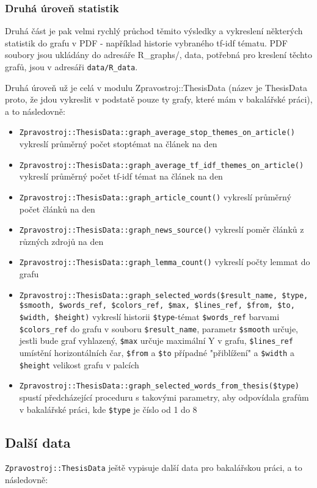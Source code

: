 \documentclass[12pt,a4paper]{report}
\begin{document}
\subsubsection{Druhá úroveň statistik}

Druhá část je pak velmi rychlý průchod těmito výsledky a vykreslení některých statistik do grafu v PDF - například historie vybraného tf-idf tématu. PDF soubory jsou ukládány do adresáře R\_graphs/, data, potřebná pro kreslení těchto grafů, jsou v adresáři \texttt{data/R\_data}.


Druhá úroveň už je celá v modulu Zpravostroj::ThesisData (název je ThesisData proto, že jdou vykreslit v podstatě pouze ty grafy, které mám v bakalářské práci), a to následovně:
\begin{itemize}
	\item \texttt{Zpravostroj::ThesisData::graph\_average\_stop\_themes\_on\_article()} vykreslí průměrný počet stoptémat na článek na den
	\item \texttt{Zpravostroj::ThesisData::graph\_average\_tf\_idf\_themes\_on\_article()} vykreslí průměrný počet tf-idf témat na článek na den
	\item \texttt{Zpravostroj::ThesisData::graph\_article\_count()} vykreslí průměrný počet článků na den
	\item \texttt{Zpravostroj::ThesisData::graph\_news\_source()} vykreslí poměr článků z různých zdrojů na den
	\item \texttt{Zpravostroj::ThesisData::graph\_lemma\_count()} vykreslí počty lemmat do grafu
	\item \texttt{Zpravostroj::ThesisData::graph\_selected\_words(\$result\_name, \$type, \$smooth, \$words\_ref, \$colors\_ref, \$max, \$lines\_ref, \$from, \$to, \$width, \$height)} vykreslí historii \texttt{\$type}-témat \texttt{\$words\_ref} barvami \texttt{\$colors\_ref} do grafu v souboru \texttt{\$result\_name}, parametr \texttt{\$smooth} určuje, jestli bude graf vyhlazený, \texttt{\$max} určuje maximální Y v grafu, \texttt{\$lines\_ref} umístění horizontálních čar, \texttt{\$from} a \texttt{\$to} případné "přiblížení" a \texttt{\$width} a \texttt{\$height} velikost grafu v palcích
	\item \texttt{Zpravostroj::ThesisData::graph\_selected\_words\_from\_thesis(\$type)} spustí předcházející proceduru s takovými parametry, aby odpovídala grafům v bakalářské práci, kde \texttt{\$type} je číslo od 1 do 8
\end{itemize}
		
\subsection{Další data}
\texttt{Zpravostroj::ThesisData} ještě vypisuje další data pro bakalářskou práci, a to následovně:
\end{document}
